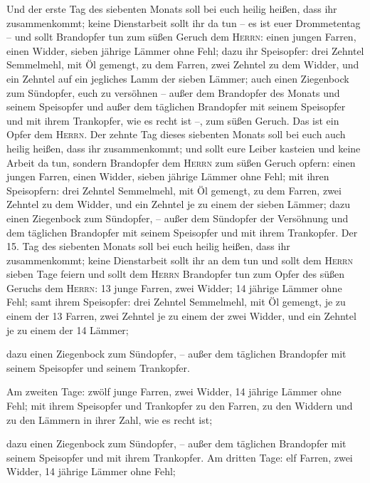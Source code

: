  Und der erste Tag des siebenten Monats soll bei euch
heilig heißen, dass ihr zusammenkommt; keine Dienstarbeit sollt ihr da
tun -- es ist euer Drommetentag --  und sollt Brandopfer
tun zum süßen Geruch dem \textsc{Herrn}: einen jungen Farren, einen
Widder, sieben jährige Lämmer ohne Fehl;  dazu ihr
Speisopfer: drei Zehntel Semmelmehl, mit Öl gemengt, zu dem Farren, zwei
Zehntel zu dem Widder,  und ein Zehntel auf ein jegliches
Lamm der sieben Lämmer;  auch einen Ziegenbock zum
Sündopfer, euch zu versöhnen --  außer dem Brandopfer des
Monats und seinem Speisopfer und außer dem täglichen Brandopfer mit
seinem Speisopfer und mit ihrem Trankopfer, wie es recht ist --, zum
süßen Geruch. Das ist ein Opfer dem \textsc{Herrn}.  Der
zehnte Tag dieses siebenten Monats soll bei euch auch heilig heißen,
dass ihr zusammenkommt; und sollt eure Leiber kasteien und keine Arbeit
da tun,  sondern Brandopfer dem \textsc{Herrn} zum süßen
Geruch opfern: einen jungen Farren, einen Widder, sieben jährige Lämmer
ohne Fehl;  mit ihren Speisopfern: drei Zehntel
Semmelmehl, mit Öl gemengt, zu dem Farren, zwei Zehntel zu dem Widder,
 und ein Zehntel je zu einem der sieben Lämmer;
 dazu einen Ziegenbock zum Sündopfer, -- außer dem
Sündopfer der Versöhnung und dem täglichen Brandopfer mit seinem
Speisopfer und mit ihrem Trankopfer.  Der 15. Tag des
siebenten Monats soll bei euch heilig heißen, dass ihr zusammenkommt;
keine Dienstarbeit sollt ihr an dem tun und sollt dem \textsc{Herrn}
sieben Tage feiern  und sollt dem \textsc{Herrn}
Brandopfer tun zum Opfer des süßen Geruchs dem \textsc{Herrn}: 13 junge
Farren, zwei Widder; 14 jährige Lämmer ohne Fehl;  samt
ihrem Speisopfer: drei Zehntel Semmelmehl, mit Öl gemengt, je zu einem
der 13 Farren, zwei Zehntel je zu einem der zwei Widder, 
und ein Zehntel je zu einem der 14 Lämmer;

 dazu einen Ziegenbock zum Sündopfer, -- außer dem
täglichen Brandopfer mit seinem Speisopfer und seinem Trankopfer.

 Am zweiten Tage: zwölf junge Farren, zwei Widder, 14
jährige Lämmer ohne Fehl;  mit ihrem Speisopfer und
Trankopfer zu den Farren, zu den Widdern und zu den Lämmern in ihrer
Zahl, wie es recht ist;

 dazu einen Ziegenbock zum Sündopfer, -- außer dem
täglichen Brandopfer mit seinem Speisopfer und mit ihrem Trankopfer.
 Am dritten Tage: elf Farren, zwei Widder, 14 jährige
Lämmer ohne Fehl;

